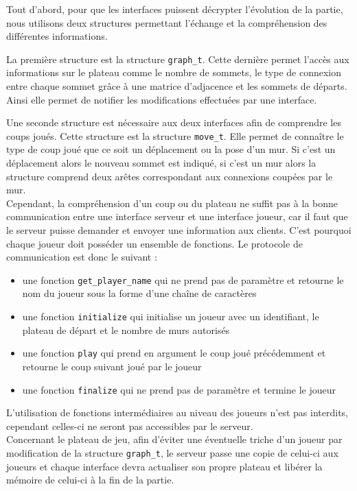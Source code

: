 \documentclass[11pt]{article}
\begin{document}
Tout d'abord, pour que les interfaces puissent décrypter l'évolution de la partie, nous utilisons deux structures permettant l'échange et la compréhension des différentes informations.

La première structure est la structure \texttt{graph\_t}. Cette dernière permet l'accès aux informations sur le plateau comme le nombre de sommets, le type de connexion entre chaque sommet grâce à une matrice d'adjacence et les sommets de départs. Ainsi elle permet de notifier les modifications effectuées par une interface. 

Une seconde structure est nécessaire aux deux interfaces afin de comprendre les coups joués. Cette structure est la structure \texttt{move\_t}. Elle permet de connaître le type de coup joué que ce soit un déplacement ou la pose d'un mur. Si c'est un déplacement alors le nouveau sommet est indiqué, si c'est un mur alors la structure comprend deux arêtes correspondant aux connexions coupées par le mur. \\

Cependant, la compréhension d'un coup ou du plateau ne suffit pas à la bonne communication entre une interface serveur et une interface joueur, car il faut que le serveur puisse demander et envoyer une information aux clients. C'est pourquoi chaque joueur doit posséder un ensemble de fonctions. Le protocole de communication est donc le suivant :
\begin{itemize}
    \item une fonction \texttt{get\_player\_name} qui ne prend pas de paramètre et retourne le nom du joueur sous la forme d'une chaîne de caractères
    \item une fonction \texttt{initialize} qui initialise un joueur avec un identifiant, le plateau de départ et le nombre de murs autorisés
    \item une fonction \texttt{play} qui prend en argument le coup joué précédemment et retourne le coup suivant joué par le joueur
    \item une fonction \texttt{finalize} qui ne prend pas de paramètre et termine le joueur
\end{itemize}

L'utilisation de fonctions intermédiaires au niveau des joueurs n'est pas interdits, cependant celles-ci ne seront pas accessibles par le serveur. \\

Concernant le plateau de jeu, afin d'éviter une éventuelle triche d'un joueur par modification de la structure \texttt{graph\_t}, le serveur passe une copie de celui-ci aux joueurs et chaque interface devra actualiser son propre plateau et libérer la mémoire de celui-ci à la fin de la partie.
\end{document}

